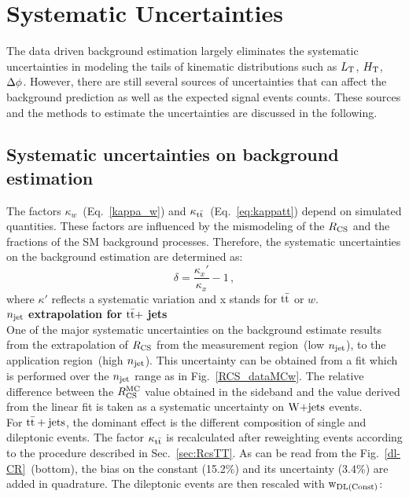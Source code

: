 \chapter{Systematic Uncertainties}
\label{chapter:systematics}
The data driven background estimation largely eliminates the systematic uncertainties in modeling the tails of kinematic distributions such as $L_{\rm T}$, $H_{\rm T}$, $\Delta \phi$. However, there are still several sources of uncertainties that can affect the background prediction as well as the expected signal events counts. These sources and the methods to estimate the uncertainties are discussed in the following.
\section{Systematic uncertainties on background estimation}
The factors $\kappa_w$~(Eq.~\ref{kappa_w}) and $\kappa_{\rm t\bar{t}}$~(Eq.~\ref{eq:kappatt}) depend on simulated quantities. These factors are influenced by the mismodeling of the $R_{\rm CS}$ and the fractions of the SM background processes. Therefore, the systematic uncertainties on the background estimation are determined as:
\begin{equation}
\label{eqn:syst_unc_kappa}
\delta = \frac{\kappa _x'}{\kappa _x}-1\, ,
\end{equation}
where $\kappa'$ reflects a systematic variation and x stands for $\rm t\bar{t}$ or $w$.\\
{\boldmath $n_{\rm jet}$} \textbf{extrapolation for}  {\boldmath $\rm t\bar{t}+$} \textbf{jets}\\
One of the major systematic uncertainties on the background estimate results from the extrapolation of $R_{\rm CS}$ from the measurement region~(low $n_{\rm jet}$), to the application region~(high $n_{\rm jet}$). This uncertainty can be obtained from a fit which is performed over the $n_{\rm jet}$ range as in Fig.~\ref{RCS_dataMCw}. The relative difference between the $R_{\rm CS}^{\rm MC}$ value obtained in the sideband and the value derived from the linear fit is taken as a systematic uncertainty on $\textrm{W+jets}$ events.\\
For ${\rm t\bar{t}+jets}$, the dominant effect is the different composition of single and dileptonic events.
The factor $\kappa_{\rm t\bar{t}}$ is recalculated after reweighting events according to the procedure described in Sec.~\ref{sec:RcsTT}. 
As can be read from the Fig.~\ref{dl-CR}~(bottom), the bias on the constant (15.2\%) and its uncertainty (3.4\%) are added in quadrature. The dileptonic events are then rescaled with ${\rm w_{DL(Const)}}$:
